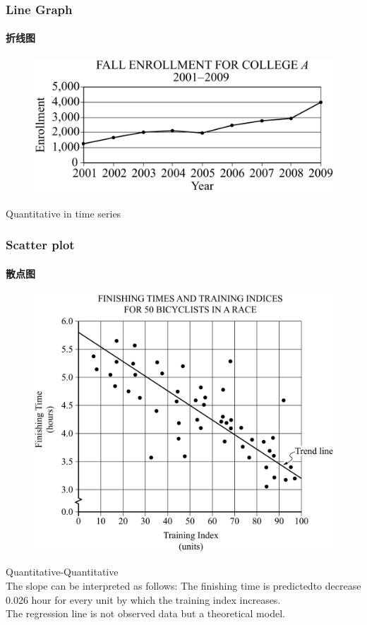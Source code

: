 \documentclass[
	11pt, %
]{beamer}
\begin{document}

\begin{frame}
	\frametitle{Line Graph}
	\framesubtitle{折线图} %

	\begin{figure}
		\includegraphics[width=0.5\linewidth]{Line_Graph.jpg}
	\end{figure}
	\alert{Quantitative in time series}
\end{frame}



\begin{frame}
	\frametitle{Scatter plot}
	\framesubtitle{散点图} %

	\begin{figure}
		\includegraphics[width=0.5\linewidth]{Scatter_Plot.jpg}
	\end{figure}
	\alert{Quantitative-Quantitative}\\
	The slope can be interpreted as follows: The finishing time is \alert{predicted}to
decrease 0.026 hour for every unit by which the training index increases.\\
\alert{The regression line is not observed data but a theoretical model.}
\end{frame}

\end{document}

